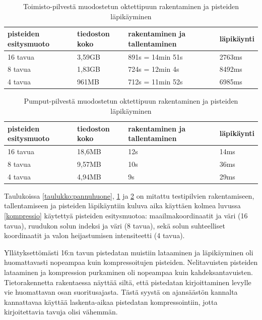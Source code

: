 \begin{table}[h]
    \begin{tabular}{llll}
    \hline
    pisteiden esitysmuoto & tiedoston koko & rakentaminen ja tallentaminen & läpikäynti \\ \hline
    16 tavua & 3,59GB              & 891s = 14min 51s              & 2763ms     \\
    8 tavua  & 1,83GB              & 724s = 12min 4s               & 8492ms     \\
    4 tavua & 961MB               & 712s = 11min 52s              & 6985ms     \\ \hline
    \end{tabular}
    \caption{Toimisto-pilvestä muodostetun oktettipuun rakentaminen ja pisteiden läpikäyminen}
    \label{taulukko:toimisto}
\end{table}

\begin{table}[h]
    \begin{tabular}{llll}
    \hline
    pisteiden esitysmuoto & tiedoston koko & rakentaminen ja tallentaminen & läpikäynti \\ \hline
    16 tavua       & 18,6MB              & 12s                           & 14ms       \\
    8 tavua      & 9,57MB              & 10s                           & 36ms       \\
    4 tavua      & 4,94MB              & 9s                            & 29ms       \\ \hline
    \end{tabular}
    \caption{Pumput-pilvestä muodostetun oktettipuun rakentaminen ja pisteiden läpikäyminen}
    \label{taulukko:pumput}
\end{table}

Taulukoissa \ref{taulukko:pannuhuone}, \ref{taulukko:toimisto} ja \ref{taulukko:pumput} on mitattu testipilvien rakentamiseen, tallentamiseen ja pisteiden läpikäyntiin kuluva aika käyttäen kolmea luvussa \ref{kompressio} käytettyä pisteiden esitysmuotoa: maailmakoordinaatit ja väri (16 tavua), ruudukon solun indeksi ja väri (8 tavua), sekä solun suhteelliset koordinaatit ja valon heijastumisen intensiteetti (4 tavua). 

Yllätyksettömästi 16:n tavun pistedatan muistiin lataaminen ja läpikäyminen oli huomattavasti nopeampaa kuin kompressoitujen pisteiden. Nelitavuisten pisteiden lataaminen ja kompression purkaminen oli nopeampaa kuin kahdeksantavuisten. Tietorakennetta rakentaessa näyttää siltä, että pistedatan kirjoittaminen levylle vie huomattavan osan suoritusajasta. Tästä syystä on ajansäästön kannalta kannattavaa käyttää laskenta-aikaa pistedatan kompressointiin, jotta kirjoitettavia tavuja olisi vähemmän. 


